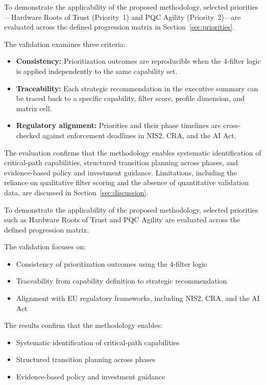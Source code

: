 \documentclass{ieeeaccess}
\begin{document}
To demonstrate the applicability of the proposed methodology, selected priorities---Hardware Roots of Trust (Priority~1) and PQC Agility (Priority~2)---are evaluated across the defined progression matrix in Section~\ref{sec:priorities}.

The validation examines three criteria:
\begin{itemize}
    \item \textbf{Consistency:} Prioritization outcomes are reproducible when the 4-filter logic is applied independently to the same capability set.
    \item \textbf{Traceability:} Each strategic recommendation in the executive summary can be traced back to a specific capability, filter score, profile dimension, and matrix cell.
    \item \textbf{Regulatory alignment:} Priorities and their phase timelines are cross-checked against enforcement deadlines in NIS2, CRA, and the AI Act.
\end{itemize}

The evaluation confirms that the methodology enables systematic identification of critical-path capabilities, structured transition planning across phases, and evidence-based policy and investment guidance. Limitations, including the reliance on qualitative filter scoring and the absence of quantitative validation data, are discussed in Section~\ref{sec:discussion}.



To demonstrate the applicability of the proposed methodology, selected priorities such as Hardware Roots of Trust and PQC Agility are evaluated across the defined progression matrix.

The validation focuses on:
\begin{itemize}
    \item Consistency of prioritization outcomes using the 4-filter logic
    \item Traceability from capability definition to strategic recommendation
    \item Alignment with EU regulatory frameworks, including NIS2, CRA, and the AI Act
\end{itemize}

The results confirm that the methodology enables:
\begin{itemize}
    \item Systematic identification of critical-path capabilities
    \item Structured transition planning across phases
    \item Evidence-based policy and investment guidance
\end{itemize}
\end{document}
